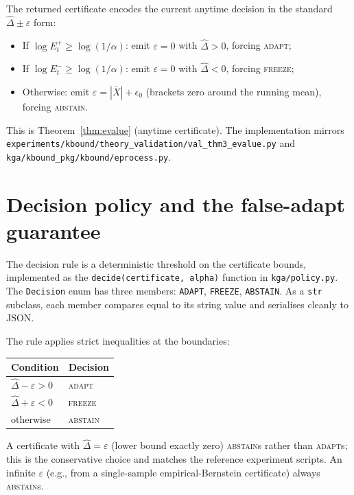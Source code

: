The returned certificate encodes the current anytime decision in the standard
$\widehat\Delta \pm \varepsilon$ form:
\begin{itemize}
  \item If $\log E_t^+ \geq \log(1/\alpha)$: emit $\varepsilon = 0$ with
    $\widehat\Delta > 0$, forcing \textsc{adapt};
  \item If $\log E_t^- \geq \log(1/\alpha)$: emit $\varepsilon = 0$ with
    $\widehat\Delta < 0$, forcing \textsc{freeze};
  \item Otherwise: emit $\varepsilon = |\bar{X}| + \epsilon_0$ (brackets zero
    around the running mean), forcing \textsc{abstain}.
\end{itemize}
This is Theorem~\ref{thm:evalue} (anytime certificate).  The implementation
mirrors \texttt{experiments/kbound/theory\_validation/val\_thm3\_evalue.py} and
\texttt{kga/kbound\_pkg/kbound/eprocess.py}.

\section{Decision policy and the false-adapt guarantee}
\label{sec:kga-policy}

The decision rule is a deterministic threshold on the certificate bounds,
implemented as the \texttt{decide(certificate, alpha)} function in
\texttt{kga/policy.py}.  The \texttt{Decision} enum has three members:
\texttt{ADAPT}, \texttt{FREEZE}, \texttt{ABSTAIN}.  As a \texttt{str} subclass,
each member compares equal to its string value and serialises cleanly to JSON.

The rule applies strict inequalities at the boundaries:

\begin{center}
\begin{tabular}{ll}
\toprule
Condition & Decision \\
\midrule
$\widehat\Delta - \varepsilon > 0$ & \textsc{adapt} \\
$\widehat\Delta + \varepsilon < 0$ & \textsc{freeze} \\
otherwise & \textsc{abstain} \\
\bottomrule
\end{tabular}
\end{center}

A certificate with $\widehat\Delta = \varepsilon$ (lower bound exactly zero)
\textsc{abstain}s rather than \textsc{adapt}s; this is the conservative choice
and matches the reference experiment scripts.  An infinite $\varepsilon$
(e.g., from a single-sample empirical-Bernstein certificate) always
\textsc{abstain}s.


